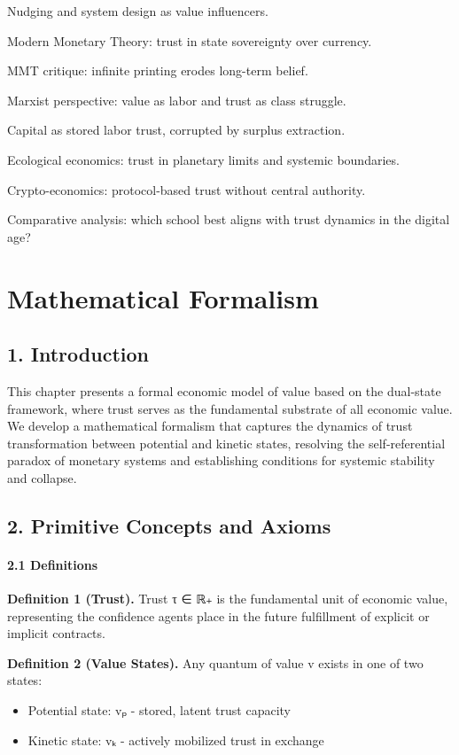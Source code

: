 \documentclass[11pt,oneside]{book}
\begin{document}
Nudging and system design as value influencers.

Modern Monetary Theory: trust in state sovereignty over currency.

MMT critique: infinite printing erodes long-term belief.

Marxist perspective: value as labor and trust as class struggle.

Capital as stored labor trust, corrupted by surplus extraction.

Ecological economics: trust in planetary limits and systemic boundaries.

Crypto-economics: protocol-based trust without central authority.

Comparative analysis: which school best aligns with trust dynamics in the digital age?



\appendix
\chapter{ Mathematical Formalism}

\section{1. Introduction}

This chapter presents a formal economic model of value based on the dual-state framework, where trust serves as the fundamental substrate of all economic value. We develop a mathematical formalism that captures the dynamics of trust transformation between potential and kinetic states, resolving the self-referential paradox of monetary systems and establishing conditions for systemic stability and collapse.

\section{2. Primitive Concepts and Axioms}

\subsubsection{2.1 Definitions}

\textbf{Definition 1 (Trust).} Trust τ ∈ ℝ₊ is the fundamental unit of economic value, representing the confidence agents place in the future fulfillment of explicit or implicit contracts.

\textbf{Definition 2 (Value States).} Any quantum of value v exists in one of two states:
\begin{itemize}
\item Potential state: vₚ - stored, latent trust capacity
\item Kinetic state: vₖ - actively mobilized trust in exchange
\end{itemize}
\end{document}
